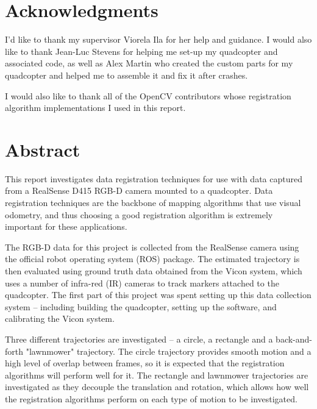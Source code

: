 \documentclass[12pt,a4paper]{article}
\begin{document}
\author{Katrina Ashton}

\pagestyle{fancy}
\fancyhf{}
\rhead{\thepage}



\vspace*{\fill}
\section*{Acknowledgments}
I'd like to thank my supervisor Viorela Ila for her help and guidance. I would also like to thank Jean-Luc Stevens for helping me set-up my quadcopter and associated code, as well as Alex Martin who created the custom parts for my quadcopter and helped me to assemble it and fix it after crashes.
 
I would also like to thank all of the OpenCV contributors whose registration algorithm implementations I used in this report.
\vspace*{\fill}

\newpage



\section*{Abstract}
This report investigates data registration techniques for use with data captured from a RealSense D415 RGB-D camera mounted to a quadcopter. Data registration techniques are the backbone of mapping algorithms that use visual odometry, and thus choosing a good registration algorithm is extremely important for these applications. 
 
The RGB-D data for this project is collected from the RealSense camera using the official robot operating system (ROS) package. The estimated trajectory is then evaluated using ground truth data obtained from the Vicon system, which uses a number of infra-red (IR) cameras to track markers attached to the quadcopter. The first part of this project was spent setting up this data collection system -- including building the quadcopter, setting up the software, and calibrating the Vicon system.
 
Three different trajectories are investigated -- a circle, a rectangle and a back-and-forth "lawnmower" trajectory. The circle trajectory provides smooth motion and a high level of overlap between frames, so it is expected that the registration algorithms will perform well for it. The rectangle and lawnmower trajectories are investigated as they decouple the translation and rotation, which allows how well the registration algorithms perform on each type of motion to be investigated. 
\end{document}
